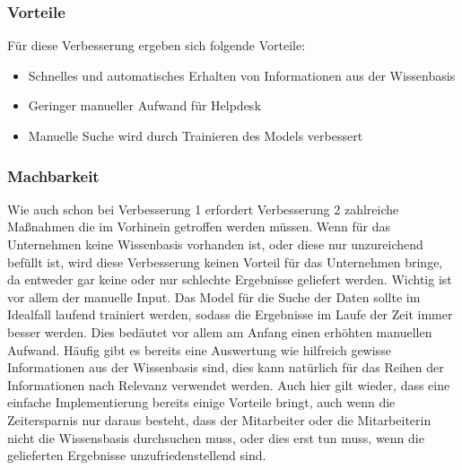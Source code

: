 \subsubsection{Vorteile}
Für diese Verbesserung ergeben sich folgende Vorteile:

\begin{itemize}
	\item Schnelles und automatisches Erhalten von Informationen aus der Wissenbasis
	\item Geringer manueller Aufwand für Helpdesk
	\item Manuelle Suche wird durch Trainieren des Models verbessert
\end{itemize}

\subsubsection{Machbarkeit}
Wie auch schon bei Verbesserung 1 erfordert Verbesserung 2 zahlreiche Maßnahmen die im Vorhinein getroffen werden müssen. Wenn für das Unternehmen keine Wissenbasis vorhanden ist, oder diese nur unzureichend befüllt ist, wird diese Verbesserung keinen Vorteil für das Unternehmen bringe, da entweder gar keine oder nur schlechte Ergebnisse geliefert werden. Wichtig ist vor allem der manuelle Input. Das Model für die Suche der Daten sollte im Idealfall laufend trainiert werden, sodass die Ergebnisse im Laufe der Zeit immer besser werden. Dies bedäutet vor allem am Anfang einen erhöhten manuellen Aufwand. Häufig gibt es bereits eine Auswertung wie hilfreich gewisse Informationen aus der Wissenbasis sind, dies kann natürlich für das Reihen der Informationen nach Relevanz verwendet werden. Auch hier gilt wieder, dass eine einfache Implementierung bereits einige Vorteile bringt, auch wenn die Zeitersparnis nur daraus besteht, dass der Mitarbeiter oder die Mitarbeiterin nicht die Wissensbasis durchsuchen muss, oder dies erst tun muss, wenn die gelieferten Ergebnisse unzufriedenstellend sind. 

